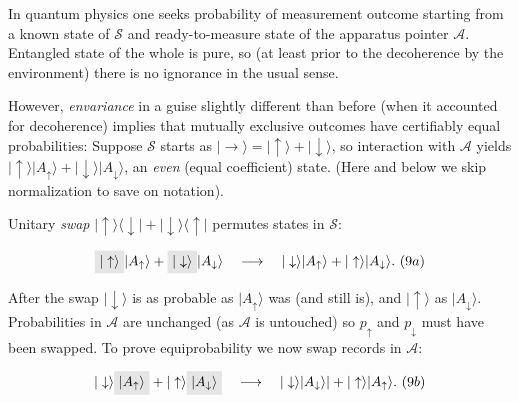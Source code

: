 \documentclass[aps,amsmath,amssymb,amsfonts,floatfix]{revtex4-1}
\newcommand{\ket}[1]    {| #1 \rangle}
\newcommand{\kb}[2]     {| #1 \rangle \! \langle #2 |}
\newcommand{\cS}        {{\mathcal S}}
\newcommand{\cA}        {{\mathcal A}}
\newcommand{\+}         {\dagger}
\begin{document}
{In quantum physics one seeks probability of measurement outcome starting from a known state of $\cS$ and ready-to-measure state of the apparatus pointer $\cA$. Entangled state of the whole is pure, so (at least prior to the decoherence by the environment) there is no ignorance in the usual sense. 

However, 
{\it envariance} in a guise slightly different than before (when it accounted for decoherence) implies that mutually exclusive outcomes have certifiably equal probabilities:
Suppose $\cS$ starts as $\ket \rightarrow = { \ket \uparrow + \ket \downarrow} $, so interaction with $\cA$ yields $ { \ket \uparrow \ket {A_\uparrow}  + \ket \downarrow \ket {A_\downarrow}}$, an {\it even} (equal coefficient) state. 
(Here and below we skip normalization to save on notation).

Unitary {\it swap} $ \kb \uparrow \downarrow + \kb \downarrow \uparrow$ permutes states in $\cS$:

\vspace{-.22cm}

\[
\tikz[baseline]{
            \node[fill=gray!20,anchor=base] (t1)
            {$|\uparrow \rangle$};
        } 
| {A_\uparrow} \rangle 
+
\tikz[baseline]{
            \node[fill=gray!20,anchor=base] (t2)
            {$|\downarrow \rangle$};
        }
|{A_\downarrow} \rangle
\quad \longrightarrow \quad
| \downarrow\rangle |{A_\uparrow} \rangle + |\uparrow  \rangle | {A_\downarrow}\rangle . \ \eqnum ((9a)
\]
%
%

\vspace{.2cm} 

\noindent 
After the swap $ \ket \downarrow $ is as probable as $\ket {A_\uparrow}$ was (and still is), and $\ket \uparrow$ as $\ket {A_\downarrow}$.  Probabilities in $\cA$ are unchanged 
(as $\cA$ is untouched) so $p_\uparrow$ and $p_\downarrow$ must have been swapped. To prove equiprobability we now 
swap records in $\cA$:


%
\[
|\downarrow\rangle \tikz[baseline]{
            \node[fill=gray!20,anchor=base] (t3)
            {$| {A_\uparrow}\rangle$};
        } 
+
|\uparrow \rangle
\tikz[baseline]{
            \node[fill=gray!20,anchor=base] (t4)
            {$|{A_\downarrow} \rangle$};
        }
\quad \longrightarrow \quad
|\downarrow\rangle |{A_\downarrow} \rangle| + |\uparrow \rangle | {A_\uparrow}\rangle . \ \eqnum ((9b)
\]
%
%

}
\end{document}
